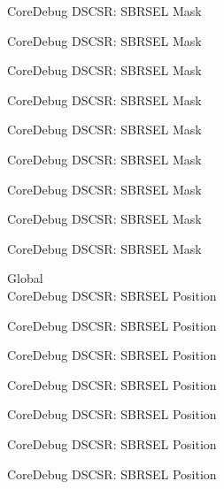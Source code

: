 \begin{DoxyRefList}
\label{deprecated__deprecated000649}%
%
Core\+Debug DSCSR\+: SBRSEL Mask 

\label{deprecated__deprecated000774}%
%
Core\+Debug DSCSR\+: SBRSEL Mask 

\label{deprecated__deprecated000828}%
%
Core\+Debug DSCSR\+: SBRSEL Mask 

\label{deprecated__deprecated000904}%
%
Core\+Debug DSCSR\+: SBRSEL Mask 

\label{deprecated__deprecated000967}%
%
Core\+Debug DSCSR\+: SBRSEL Mask 

\label{deprecated__deprecated001046}%
%
Core\+Debug DSCSR\+: SBRSEL Mask 

\label{deprecated__deprecated001122}%
%
Core\+Debug DSCSR\+: SBRSEL Mask 

\label{deprecated__deprecated001225}%
%
Core\+Debug DSCSR\+: SBRSEL Mask 

\label{deprecated__deprecated001327}%
%
Core\+Debug DSCSR\+: SBRSEL Mask  
\item[Global \doxylink{group___c_m_s_i_s___s_c_b_ga7450603163415ab4d4e4a7a767879eae}{Core\+Debug\+\_\+\+DSCSR\+\_\+\+SBRSEL\+\_\+\+Pos} ]\hfill \\
\label{deprecated__deprecated000095}%
%
Core\+Debug DSCSR\+: SBRSEL Position 

\label{deprecated__deprecated000149}%
%
Core\+Debug DSCSR\+: SBRSEL Position 

\label{deprecated__deprecated000225}%
%
Core\+Debug DSCSR\+: SBRSEL Position 

\label{deprecated__deprecated000288}%
%
Core\+Debug DSCSR\+: SBRSEL Position 

\label{deprecated__deprecated000367}%
%
Core\+Debug DSCSR\+: SBRSEL Position 

\label{deprecated__deprecated000443}%
%
Core\+Debug DSCSR\+: SBRSEL Position 

\label{deprecated__deprecated000546}%
%
Core\+Debug DSCSR\+: SBRSEL Position 


\end{DoxyRefList}
